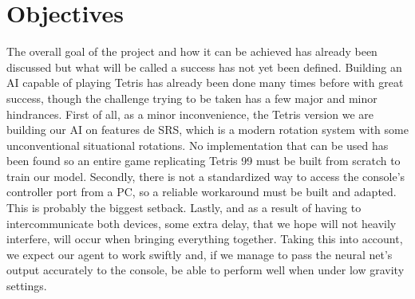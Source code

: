 \section{Objectives}

The overall goal of the project and how it can be achieved has already been discussed but what will be called a success has not yet been defined.
Building an AI capable of playing Tetris has already been done many times before with great success, though the challenge trying to be taken has a few major and minor hindrances.
First of all, as a minor inconvenience, the Tetris version we are building our AI on features de \ac{SRS}, which is a modern rotation system with some unconventional situational rotations. No implementation that can be used has been found so an entire game replicating Tetris 99 must be built from scratch to train our model.
Secondly, there is not a standardized way to access the console’s controller port from a PC, so a reliable workaround must be built and adapted. This is probably the biggest setback.
Lastly, and as a result of having to intercommunicate both devices, some extra delay, that we hope will not heavily interfere, will occur when bringing everything together.
Taking this into account, we expect our agent to work swiftly and, if we manage to pass the neural net’s output accurately to the console, be able to perform well when under low gravity settings.

